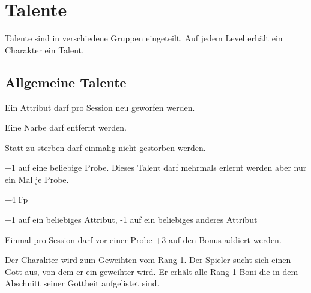 \documentclass[../../Heldenanleitung2]{subfiles}
\begin{document}
\section{Talente}

Talente sind in verschiedene Gruppen eingeteilt. Auf jedem Level erhält ein Charakter ein Talent.

\subsection{Allgemeine Talente}

\begin{multicols}{2}

\begin{tcolorbox}[title={Glücklicher}, colbacktitle=gray]    
   Ein Attribut darf pro Session neu geworfen werden.
\end{tcolorbox}

\begin{tcolorbox}[title={Glück im Unglück}, colbacktitle=gray]    
   Eine Narbe darf entfernt werden.
\end{tcolorbox}

\begin{tcolorbox}[title={Nahtoderfahrungen}, colbacktitle=gray]    
   Statt zu sterben darf einmalig nicht gestorben werden.
\end{tcolorbox}

\begin{tcolorbox}[title={Fertigkeitenfokus}, colbacktitle=gray]    
   +1 auf eine beliebige Probe. Dieses Talent darf mehrmals erlernt werden aber nur ein Mal je Probe.
\end{tcolorbox}

\begin{tcolorbox}[title={Talentiert}, colbacktitle=gray]    
   +4 Fp
\end{tcolorbox}

\begin{tcolorbox}[title={Umdenken}, colbacktitle=gray]    
   +1 auf ein beliebiges Attribut, -1 auf ein beliebiges anderes Attribut
\end{tcolorbox}

\begin{tcolorbox}[title={Konzentration}, colbacktitle=gray]    
   Einmal pro Session darf vor einer Probe +3 auf den Bonus addiert werden.
\end{tcolorbox}

\begin{tcolorbox}[title={Geweihter (Rang 1)}, colbacktitle=gray]    
   Der Charakter wird zum Geweihten vom Rang 1. Der Spieler sucht sich einen Gott aus, von dem er ein geweihter wird. Er erhält alle Rang 1 Boni die in dem Abschnitt seiner Gottheit aufgelistet sind.
\end{tcolorbox}


\end{multicols}
\end{document}

